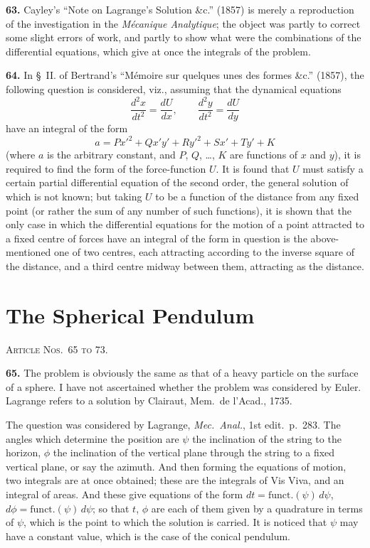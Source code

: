 \documentclass[11pt,a4paper]{book}
\begin{document}
\textbf{63.} Cayley's ``Note on Lagrange's Solution \&c.'' (1857) is merely a reproduction of the investigation in the \textit{M\'ecanique Analytique}; the object was partly to correct some slight errors of work, and partly to show what were the combinations of the differential equations, which give at once the integrals of the problem.

\textbf{64.} In \S~II. of Bertrand's ``M\'emoire sur quelques unes des formes \&c.'' (1857), the following question is considered, viz., assuming that the dynamical equations
\[
\frac{d^2x}{dt^2} = \frac{dU}{dx}, \qquad \frac{d^2y}{dt^2} = \frac{dU}{dy}
\]
have an integral of the form
\[
a = Px'^2 + Qx'y' + Ry'^2 + Sx' + Ty' + K
\]
(where $a$ is the arbitrary constant, and $P$, $Q$, \dots, $K$ are functions of $x$ and $y$), it is required to find the form of the force-function $U$. It is found that $U$ must satisfy a certain partial differential equation of the second order, the general solution of which is not known; but taking $U$ to be a function of the distance from any fixed point (or rather the sum of any number of such functions), it is shown that the only case in which the differential equations for the motion of a point attracted to a fixed centre of forces have an integral of the form in question is the above-mentioned one of two centres, each attracting according to the inverse square of the distance, and a third centre midway between them, attracting as the distance.


\section*{The Spherical Pendulum}
\noindent\textsc{Article Nos.~65 to 73.}

\medskip

\textbf{65.} The problem is obviously the same as that of a heavy particle on the surface of a sphere. I have not ascertained whether the problem was considered by Euler. Lagrange refers to a solution by Clairaut, Mem.\ de l'Acad., 1735.

The question was considered by Lagrange, \textit{Mec.\ Anal.}, 1st edit.\ p.~283. The angles which determine the position are $\psi$ the inclination of the string to the horizon, $\phi$ the inclination of the vertical plane through the string to a fixed vertical plane, or say the azimuth. And then forming the equations of motion, two integrals are at once obtained; these are the integrals of Vis Viva, and an integral of areas. And these give equations of the form $dt = \text{funct.}(\psi)\,d\psi$, $d\phi = \text{funct.}(\psi)\,d\psi$; so that $t$, $\phi$ are each of them given by a quadrature in terms of $\psi$, which is the point to which the solution is carried. It is noticed that $\psi$ may have a constant value, which is the case of the conical pendulum.
\end{document}
